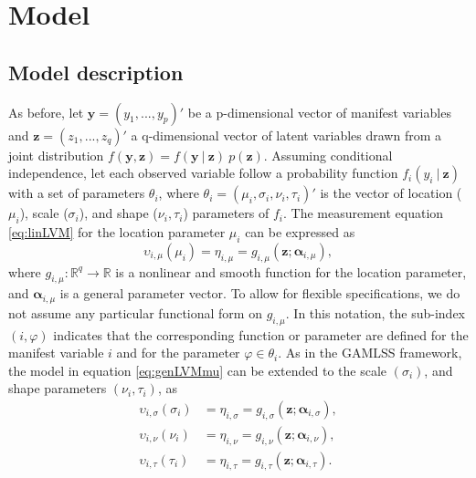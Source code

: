 \documentclass[11pt, a4paper]{article}
\newcommand{\R}{{\ensuremath{\mathbb{R}}}}
\newcommand{\cond}{\!~|~\!}
\begin{document}
\section{Model} \label{sec:Model}

\subsection{Model description}

As before, let $\mathbf{y} = (y_1,...,y_p)'$ be a p-dimensional vector of manifest variables and $\mathbf{z} = (z_1,...,z_q)'$ a q-dimensional vector of latent variables drawn from a joint distribution $f(\mathbf{y}, \mathbf{z}) = f(\mathbf{y} \cond \mathbf{z})~p(\mathbf{z})$. Assuming conditional independence, let each observed variable follow a probability function $f_i(y_i \cond \mathbf{z})$ with a set of parameters $\theta_i$,  where $\theta_i = (\mu_i, \sigma_i, \nu_i, \tau_i)'$ is the vector of location ($\mu_i$), scale ($\sigma_i$), and shape ($\nu_i, \tau_i$) parameters of $f_i$. The measurement equation \eqref{eq:linLVM} for the location parameter $\mu_i$ can be expressed as
\begin{equation}
 \upsilon_{i,\mu}(\mu_i) = \eta_{i,\mu} = g_{i,\mu}(\mathbf{z}; \bm{\alpha}_{i,\mu}), \label{eq:genLVMmu}
\end{equation}
where $g_{i,\mu}:\R^q \to \R$ is a nonlinear and smooth function for the location parameter, and $\bm{\alpha}_{i, \mu}$ is a general parameter vector. To allow for flexible specifications, we do not assume any particular functional form on $g_{i,\mu}$. In this notation, the sub-index $(i,\varphi)$ indicates that the corresponding function or parameter are defined for the manifest variable $i$ and for the parameter $\varphi \in \theta_i$. As in the GAMLSS framework, the model in equation \eqref{eq:genLVMmu} can be extended to the scale $(\sigma_i)$, and shape parameters $(\nu_i, \tau_i)$, as
\begin{align}
\upsilon_{i, \sigma}(\sigma_i) &= \eta_{i, \sigma} = g_{i, \sigma}(\mathbf{z}; \bm{\alpha}_{i, \sigma}), \label{eq:genLVMsigma}\\
\upsilon_{i, \nu}(\nu_i) &= \eta_{i, \nu} = g_{i, \nu}(\mathbf{z}; \bm{\alpha}_{i, \nu}), \label{eq:genLVMnu}\\
\upsilon_{i, \tau}(\tau_i) &= \eta_{i, \tau} = g_{i, \tau}(\mathbf{z}; \bm{\alpha}_{i, \tau}). \label{eq:genLVMtau}
\end{align}
\end{document}
